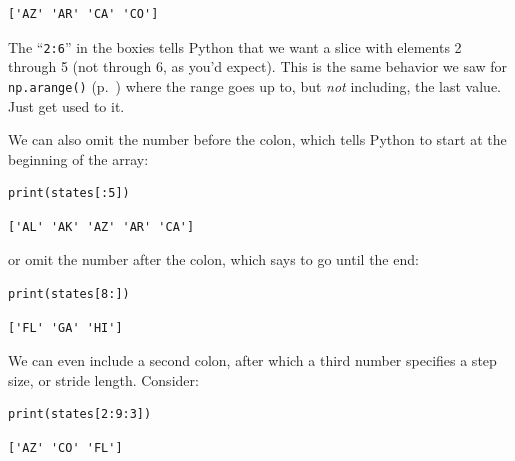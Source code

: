 \begin{Verbatim}[fontsize=\small,samepage=true,frame=leftline,framesep=5mm,framerule=1mm]
['AZ' 'AR' 'CA' 'CO']
\end{Verbatim}

The ``\texttt{2:6}'' in the boxies tells Python that we want a slice with
elements 2 through 5 (not through 6, as you'd expect). This is the same
behavior we saw for \texttt{np.arange()} (p.~\pageref{arangeNotIncludingLast})
where the range goes up to, but \textit{not} including, the last value. Just
get used to it.

\smallskip

We can also omit the number before the colon, which tells Python to start at
the beginning of the array:

\begin{Verbatim}[fontsize=\small,samepage=true,frame=single,framesep=3mm]
print(states[:5])
\end{Verbatim}
\vspace{-.2in}

\begin{Verbatim}[fontsize=\small,samepage=true,frame=leftline,framesep=5mm,framerule=1mm]
['AL' 'AK' 'AZ' 'AR' 'CA']
\end{Verbatim}

or omit the number after the colon, which says to go until the end:

\begin{Verbatim}[fontsize=\small,samepage=true,frame=single,framesep=3mm]
print(states[8:])
\end{Verbatim}
\vspace{-.2in}

\begin{Verbatim}[fontsize=\small,samepage=true,frame=leftline,framesep=5mm,framerule=1mm]
['FL' 'GA' 'HI']
\end{Verbatim}

We can even include a second colon, after which a third number specifies a step
size, or stride length. Consider:

\begin{Verbatim}[fontsize=\small,samepage=true,frame=single,framesep=3mm]
print(states[2:9:3])
\end{Verbatim}
\vspace{-.2in}

\begin{Verbatim}[fontsize=\small,samepage=true,frame=leftline,framesep=5mm,framerule=1mm]
['AZ' 'CO' 'FL']
\end{Verbatim}

